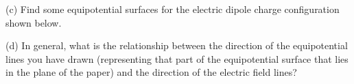 (c) Find some equipotential surfaces for the electric dipole charge
configuration shown below.

\vspace{0.3cm}
{\centering {} \par}
\vspace{0.3cm}

(d) In general, what is the relationship between the direction of
the equipotential lines you have drawn (representing that part of
the equipotential surface that lies in the plane of the paper) and
the direction of the electric field lines?
\answerspace{10mm}


